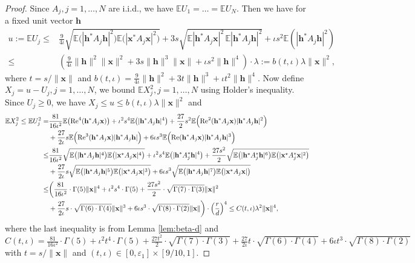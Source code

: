 \documentclass{article}
\newcommand{\E}{{\mathbb E}}
\newcommand{\re}{{\rm Re}}
\newcommand{\vx}{{\mathbf x}}
\newcommand{\vh}{{\mathbf h}}
\newcommand{\0}{{\mathbf 0}}
\numberwithin{equation}{section}
\begin{document}
	\begin{proof}
		
		
		Since $ A_j, j=1,\ldots,N $ are i.i.d., we have $\E U_1=\ldots=\E U_N$. Then we have for a fixed unit vector $ \vh $
		\begin{align*}
			u := \E U_j
			\leq& \frac{9}{4\iota}\sqrt{\E\big(|\vh^*A_j\vh|^2\big)\E\big(|\vx^*A_j\vx|^2\big)}
			+3s\sqrt{\E|\vh^*A_j\vx|^2\,\E|\vh^*A_j\vh|^2}
			+\iota s^2\E(|\vh^*A_j\vh|^2)\\
			\le&\left(\frac{9}{4\iota}\|\vh\|^2\|\vx\|^2+3s\|\vh\|^3\|\vx\|+\iota s^2\|\vh\|^4\right)\cdot \lambda:=b(t,\iota)\lambda\|\vx\|^2,
		\end{align*}
		where $t=s/\|\vx\|$ and $b(t,\iota)=\frac{9}{4\iota}\|\vh\|^2+3t\|\vh\|^3+\iota t^2\|\vh\|^4$. Now define $ X_j=u - U_j,j=1,\ldots,N $, we bound $ \E X_j ^2,j=1,\ldots,N$ using Holder's inequality. Since $ U_j\geq 0 $, we have $ X_j\leq u\leq b(t,\iota)\lambda\|\vx\|^2 $ and 
		\begin{align*}
			\E X_j^2\leq \E U_j^2=&\frac{81}{16\iota^2}\E\big(\re^4(\vh^*A_j\vx)\big)+\iota^2s^4\E\big(|\vh^*A_j\vh|^4\big)+\frac{27}{2}s^2\E\Big(\re^2(\vh^*A_j\vx)|\vh^*A_j\vh|^2\Big)\\
			&+\frac{27}{2\iota}s\E\Big(\re^3(\vh^*A_j\vx)|\vh^*A_j\vh|\Big)+6\iota s^3\E\Big(\re(\vh^*A_j\vx)|\vh^*A_j\vh|^3\Big)\\
			\le&\frac{81}{16\iota^2}\sqrt{\E\big(|\vh^*A_j\vh|^4\big)\E\big(|\vx^*A_j\vx|^4\big)}+\iota^2s^4\E\big(|\vh^*A_j^*\vh|^4\big)+\frac{27s^2}{2}\sqrt{\E\big(|\vh^*A_j^*\vh|^{6}\big)\E\big(|\vx^*A_j^*\vx|^2\big)}\\
			&+\frac{27}{2\iota}s\sqrt{\E\big(|\vh^*A_j\vh|^{5}\big)\E\big(|\vx^*A_j\vx|^3\big)}+6\iota s^3\sqrt{\E\big(|\vh^*A_j\vh|^{7}\big)\E\big(|\vx^*A_j\vx|\big)}  \\
			\leq& \bigg(\frac{81}{16\iota ^2}\cdot \Gamma(5)\|\vx\|^4+\iota ^2s^4\cdot \Gamma(5) +\frac{27s^2}{2}\cdot \sqrt{\Gamma(7)\cdot \Gamma(3)}\|\vx\|^2\\
			&+\frac{27}{2\iota }s\cdot \sqrt{ \Gamma(6)\cdot \Gamma(4)}\|\vx\|^3+6\iota  s^3\cdot  \sqrt{ \Gamma(8)\cdot \Gamma(2)}\|\vx\|\bigg) \cdot \left(\frac{r}{d}\right)^4\le C(t,\iota)\lambda^2\|\vx\|^4,
		\end{align*} 
		where the last inequality is from Lemma \ref{lem:beta-d} and $C(t,\iota)=\frac{81}{16\iota ^2}\cdot \Gamma(5)+\iota ^2t^4\cdot \Gamma(5) +\frac{27t^2}{2}\cdot \sqrt{\Gamma(7)\cdot \Gamma(3)}+\frac{27}{2\iota }t\cdot \sqrt{ \Gamma(6)\cdot \Gamma(4)}+6\iota  t^3\cdot  \sqrt{ \Gamma(8)\cdot \Gamma(2)}$ with $t=s/\|\vx\|$ and $(t,\iota)\in[0,\varepsilon_1]\times[9/10,1]$. 

\end{proof}
\end{document}
